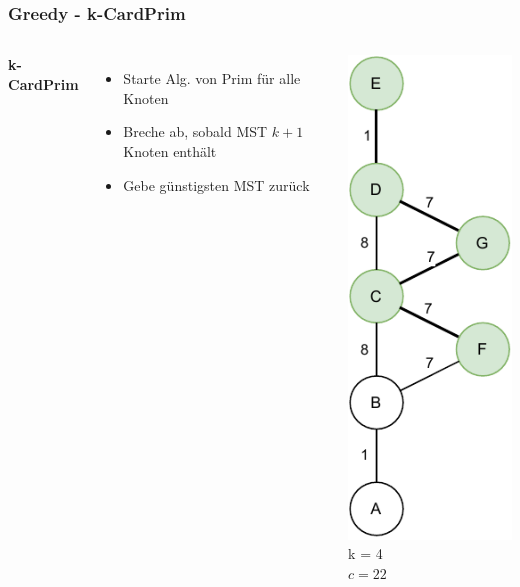 \documentclass[aspectratio=169]{beamer}
\begin{document}
\begin{frame}
	\frametitle{Greedy - k-CardPrim}
	\begin{columns}[c] %
		
		\textbf{k-CardPrim}
		\begin{itemize}
			\item Starte Alg. von Prim für alle Knoten
			\item Breche ab, sobald MST $k+1$ Knoten enthält
			\item Gebe günstigsten MST zurück
		\end{itemize}
		\includegraphics[scale=.6]{greedy_prim1.pdf}
		k = 4\\
		$c = 22$
		
		
	\end{columns}
	\end{frame}
	
\end{document}
